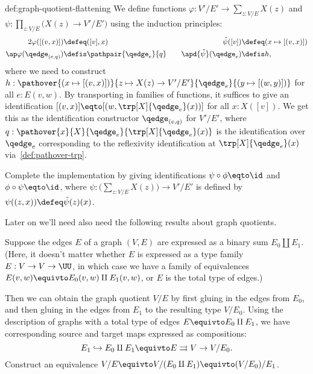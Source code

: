 \begin{implementation}{def:graph-quotient-flattening}
  We define functions $\varphi : V'/E' \to \sum_{z:V/E}X(z)$
  and $\psi : \prod_{z:V/E}\bigl(X(z) \to V'/E'\bigr)$
  using the induction principles:
  \begin{alignat*}2
    \varphi([(v,x)]) &\defeq ([v],x) &\quad
    \tilde\psi([v]) &\defeq (x \mapsto [(v,x)]) \\
    \ap\varphi(\qedge_{(e,q)}) &\defis \pathpair{\qedge_e}{q} &\quad
    \apd{\tilde\psi}(\qedge_e) &\defis h,
  \end{alignat*}
  where we need to construct
  $h : \pathover{(x \mapsto [(v,x)])}{z \mapsto X(z) \to V'/E'}{\qedge_e}
  {(y \mapsto [(w,y)])}$ for all $e : E(v,w)$.
  By transporting in families of functions,
  it suffices to give an identification
  $[(v,x)] \eqto [(w,\trp[X]{\qedge_e}(x))]$ for all $x : X([v])$.
  We get this as the identification constructor $\qedge_{(e,q)}$ for $V'/E'$,
  where $q: \pathover{x}{X}{\qedge_e}{\trp[X]{\qedge_e}(x)}$
  is the identification over $\qedge_e$ corresponding
  to the reflexivity identification at
  $\trp[X]{\qedge_e}(x)$ via~\cref{def:pathover-trp}.
\end{implementation}
\begin{xca}
  Complete the implementation by giving identifications $\psi\circ\phi\eqto\id$
  and $\phi\circ\psi\eqto\id$, where $\psi : \bigl(\sum_{z:V/E}X(z)\bigr) \to V'/E'$
  is defined by $\psi((z,x)) \defeq \tilde\psi(z)(x)$.
\end{xca}

Later on we'll need also need the following results about graph quotients.
\begin{xca}\label{xca:graph-quotient-in-steps}
  Suppose the edges $E$ of a graph $(V,E)$ are expressed as a binary sum $E_0 \amalg E_1$.
  (Here, it doesn't matter whether $E$ is expressed as a type family $E : V \to V \to \UU$,
  in which case we have a family of equivalences $E(v,w) \equivto E_0(v,w) \amalg E_1(v,w)$,
  or $E$ is the total type of edges.)

  Then we can obtain the graph quotient $V/E$ by first gluing in the edges from $E_0$,
  and then gluing in the edges from $E_1$ to the resulting type $V/E_0$.
  Using the description of graphs with a total type of edges $E \equivto E_0 \amalg E_1$,
  we have corresponding source and target maps expressed as compositions:
  \[
    E_1 \hookrightarrow E_0\amalg E_1 \equivto E \rightrightarrows V \to V/E_0.
  \]
  Construct an equivalence $V/E \equivto V/(E_0 \amalg E_1) \equivto (V/E_0)/E_1$.
\end{xca}

